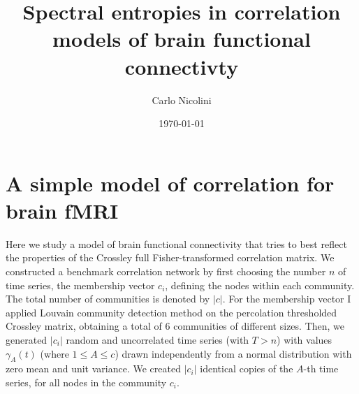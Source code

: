 \documentclass[a4paper]{article}
\begin{document}
\title{Spectral entropies in correlation models of brain functional connectivty}
\author{Carlo Nicolini}
\date{\today}
\maketitle

\section{A simple model of correlation for brain fMRI}
Here we study a model of brain functional connectivity that tries to best reflect the properties of the Crossley full Fisher-transformed correlation matrix.
We constructed a benchmark correlation network by first choosing the number $n$ of time series, the membership vector $c_i$, defining the nodes within each community. The total number of communities is denoted by $|c|$.
For the membership vector I applied Louvain community detection method on the percolation thresholded Crossley matrix, obtaining a total of 6 communities of different sizes.
Then, we generated $|c_i|$ random and uncorrelated time series (with $T>n$) with values $\gamma_A(t)$ (where $1\le A\le c$) drawn independently from a normal distribution with zero mean and unit variance.
We created $|c_i|$ identical copies of the $A$-th time series, for all nodes in the community $c_i$.
\end{document}
